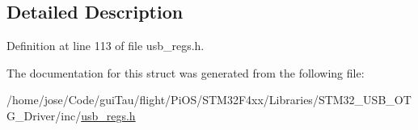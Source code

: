 \subsection{Detailed Description}


Definition at line 113 of file usb\-\_\-regs.\-h.



The documentation for this struct was generated from the following file\-:\begin{DoxyCompactItemize}
\item 
/home/jose/\-Code/gui\-Tau/flight/\-Pi\-O\-S/\-S\-T\-M32\-F4xx/\-Libraries/\-S\-T\-M32\-\_\-\-U\-S\-B\-\_\-\-O\-T\-G\-\_\-\-Driver/inc/\hyperlink{_s_t_m32_f4xx_2_libraries_2_s_t_m32___u_s_b___o_t_g___driver_2inc_2usb__regs_8h}{usb\-\_\-regs.\-h}\end{DoxyCompactItemize}
